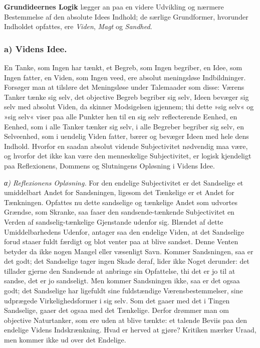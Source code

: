 \documentclass[12pt]{book}
\newcommand{\apage}[1]{\marginnote{\footnotesize\textit{[#1]}}}
\begin{document}
\textbf{Grundideernes Logik} lægger an paa en videre Udvikling og nærmere
Bestemmelse af den absolute \apage{105} Idees Indhold; de særlige Grundformer,
hvorunder Indholdet opfattes, ere \emph{Viden}, \emph{Magt} og \emph{Sandhed}.

\subsubsection*{a) Videns Idee.} En Tanke, som Ingen har tænkt, et Begreb,
som Ingen begriber, en Idee, som Ingen fatter, en Viden, som Ingen veed,
ere absolut meningsløse Indbildninger. Forsøger man at tilsløre det
Meningsløse under Talemaader som disse: Værens Tanker tænke sig selv, det
objective Begreb begriber sig selv, Ideen bevæger sig selv med absolut
Viden, da skinner Modsigelsen igjennem; thi dette »sig selv« og »sig selv«
viser paa alle Punkter hen til en sig selv reflecterende Eenhed, en Eenhed,
som i alle Tanker tænker sig selv, i alle Begreber begriber sig selv, en
Selveenhed, som i uendelig Viden fatter, bærer og bevæger Ideen med hele
dens Indhold. Hvorfor en saadan absolut vidende Subjectivitet nødvendig maa
være, og hvorfor det ikke kan være den menneskelige Subjectivitet, er
logisk kjendeligt paa Reflexionens, Dommens og Slutningens Opløsning i
Videns Idee.

\emph{α) Reflexionens Opløsning.} For den endelige Subjectivitet er det
Sandselige et umiddelbart Andet for Sandsningen, ligesom det Tænkelige er
et Andet for Tænkningen. Opfattes nu dette sandselige og tænkelige Andet
som udvortes Grændse, som Skranke, saa faaer den sandsende-tænkende
Subjectivitet en Verden af sandselig-tænkelige Gjenstande udenfor sig.
Blændet af dette Umiddelbarhedens Udenfor, antager saa den endelige Viden,
at det Sandselige forud staaer fuldt færdigt og blot venter paa at blive
sandset. Denne Venten betyder da ikke nogen Mangel eller \apage{106} væsenligt Savn.
Kommer Sandsningen, saa er det godt; det Sandselige tager ingen Skade
deraf, lider ikke Noget derunder: det tillader gjerne den Sandsende at
anbringe sin Opfattelse, thi det er jo til at sandse, det er jo sandseligt.
Men kommer Sandsningen ikke, saa er det ogsaa godt; det Sandselige har
ligefuldt sine fuldstændige Værensbestemmelser, sine udprægede
Virkelighedsformer i sig selv. Som det gaaer med det i Tingen Sandselige,
gaaer det ogsaa med det Tænkelige. Derfor drømmer man om objective
Naturtanker, som ere uden at blive tænkte: et talende Beviis paa den
endelige Videns Indskrænkning. Hvad er herved at gjøre? Kritiken mærker
Uraad, men kommer ikke ud over det Endelige.
\end{document}
